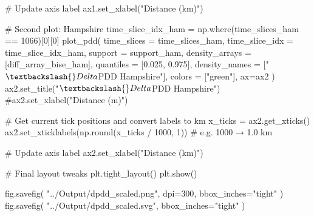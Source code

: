 \documentclass[
  11pt,
  letterpaper,
  DIV=11,
  numbers=noendperiod]{scrartcl}
\newenvironment{Shaded}{\begin{snugshade}}{\end{snugshade}}
\newcommand{\BuiltInTok}[1]{\textcolor[rgb]{0.00,0.23,0.31}{#1}}
\newcommand{\CommentTok}[1]{\textcolor[rgb]{0.37,0.37,0.37}{#1}}
\newcommand{\DecValTok}[1]{\textcolor[rgb]{0.68,0.00,0.00}{#1}}
\newcommand{\FloatTok}[1]{\textcolor[rgb]{0.68,0.00,0.00}{#1}}
\newcommand{\NormalTok}[1]{\textcolor[rgb]{0.00,0.23,0.31}{#1}}
\newcommand{\OperatorTok}[1]{\textcolor[rgb]{0.37,0.37,0.37}{#1}}
\newcommand{\StringTok}[1]{\textcolor[rgb]{0.13,0.47,0.30}{#1}}
\begin{document}
\begin{Shaded}
\begin{Highlighting}[]
\CommentTok{\# Update axis label}
\NormalTok{ax1.set\_xlabel(}\StringTok{"Distance (km)"}\NormalTok{)}

\CommentTok{\# Second plot: Hampshire}
\NormalTok{time\_slice\_idx\_ham }\OperatorTok{=}\NormalTok{ np.where(time\_slices\_ham }\OperatorTok{==} \DecValTok{1066}\NormalTok{)[}\DecValTok{0}\NormalTok{][}\DecValTok{0}\NormalTok{]}
\NormalTok{plot\_pdd(}
\NormalTok{    time\_slices }\OperatorTok{=}\NormalTok{ time\_slices\_ham,}
\NormalTok{    time\_slice\_idx }\OperatorTok{=}\NormalTok{ time\_slice\_idx\_ham,}
\NormalTok{    support }\OperatorTok{=}\NormalTok{ support\_ham,}
\NormalTok{    density\_arrays }\OperatorTok{=}\NormalTok{ [diff\_array\_bise\_ham],}
\NormalTok{    quantiles }\OperatorTok{=}\NormalTok{ [}\FloatTok{0.025}\NormalTok{, }\FloatTok{0.975}\NormalTok{],}
\NormalTok{    density\_names }\OperatorTok{=}\NormalTok{ [}\StringTok{"$\textbackslash{}Delta$PDD Hampshire"}\NormalTok{],}
\NormalTok{    colors }\OperatorTok{=}\NormalTok{ [}\StringTok{"green"}\NormalTok{],}
\NormalTok{    ax}\OperatorTok{=}\NormalTok{ax2}
\NormalTok{)}
\NormalTok{ax2.set\_title(}\StringTok{"$\textbackslash{}Delta$PDD Hampshire"}\NormalTok{)}
\CommentTok{\#ax2.set\_xlabel("Distance (m)")}

\CommentTok{\# Get current tick positions and convert labels to km}
\NormalTok{x\_ticks }\OperatorTok{=}\NormalTok{ ax2.get\_xticks()}
\NormalTok{ax2.set\_xticklabels(np.}\BuiltInTok{round}\NormalTok{(x\_ticks }\OperatorTok{/} \DecValTok{1000}\NormalTok{, }\DecValTok{1}\NormalTok{))  }\CommentTok{\# e.g. 1000 → 1.0 km}

\CommentTok{\# Update axis label}
\NormalTok{ax2.set\_xlabel(}\StringTok{"Distance (km)"}\NormalTok{)}

\CommentTok{\# Final layout tweaks}
\NormalTok{plt.tight\_layout()}
\NormalTok{plt.show()}

\NormalTok{fig.savefig(}
    \StringTok{"../Output/dpdd\_scaled.png"}\NormalTok{, }
\NormalTok{    dpi}\OperatorTok{=}\DecValTok{300}\NormalTok{, }
\NormalTok{    bbox\_inches}\OperatorTok{=}\StringTok{"tight"}
\NormalTok{)}
\NormalTok{fig.savefig(}
    \StringTok{"../Output/dpdd\_scaled.svg"}\NormalTok{, }
\NormalTok{    bbox\_inches}\OperatorTok{=}\StringTok{"tight"}
\NormalTok{)}
\end{Highlighting}
\end{Shaded}
\end{document}

